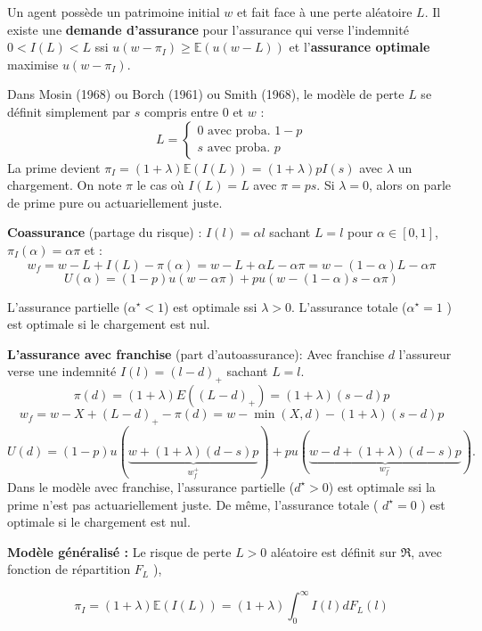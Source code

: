 \begin{f}
	
Un agent possède un patrimoine initial \(w\) et fait face à une perte aléatoire \(L\). Il existe une \textbf{demande d'assurance} pour l'assurance qui verse l'indemnité \(0<I(L)<L\) ssi \(u(w-\pi_I) \geq \mathbb{E}(u(w-L))\) et l'\textbf{assurance optimale} maximise \(u(w-\pi_I)\).

Dans Mosin (1968) ou  Borch (1961) ou Smith (1968), le modèle de perte \(L\) se définit simplement par  \(s\) compris entre 0 et  \(w\) :
	\[
	L=\left\{\begin{array}{l}
		0 \text { avec proba. } 1-p \\
		s \text { avec proba. } p
	\end{array}\right.
	\]
La prime devient \(\pi_I=(1+\lambda) \mathbb{E}(I(L))=(1+\lambda) p I(s)\) avec \(\lambda\) un chargement. On note \(\pi\) le cas où \(I(L)=L\) avec  \(\pi= p s\). Si \(\lambda=0\), alors on parle de prime pure ou actuariellement juste. 
\medskip

\textbf{Coassurance} (partage du risque) :
 \(I(l)=\alpha l\) sachant \(L=l\) pour \(\alpha \in[0,1]\), \(\pi_I(\alpha)=\alpha \pi\) et :
\[
w_{f}=w-L+I(L)-\pi(\alpha)=w-L+\alpha L-\alpha \pi=w-(1-\alpha) L-\alpha \pi
\]
\[
U(\alpha)%
=(1-p) u(w-\alpha \pi)+p u(w-(1-\alpha) s-\alpha \pi)
\]

L'assurance partielle (\(\alpha^{\star}<1\)) est optimale ssi \(\lambda>0\). L'assurance totale (\(\alpha^{\star}=1\) ) est optimale si le chargement est nul.
\medskip

\textbf{L'assurance avec franchise} (part d'autoassurance):
Avec franchise \(d\) l'assureur verse une indemnité \(I(l)=(l-d)_{+}\) sachant \(L=l\). 
\[
\pi(d)=(1+\lambda) E\left((L-d)_{+}\right)=(1+\lambda)(s-d) p
\]
\[
w_{f}=w-X+(L-d)_{+}-\pi(d)=w-\min (X, d)-(1+\lambda)(s-d) p
\]
\[
U(d)=(1-p) u(\underbrace{w+(1+\lambda)(d-s) p}_{w_{f}^{+}})+p u(\underbrace{w-d+(1+\lambda)(d-s) p}_{w_{f}^{-}}) .
\]
Dans le modèle avec franchise, l'assurance partielle (\(d^{\star}>0\)) est optimale ssi la prime n'est pas actuariellement juste. De même,  l'assurance totale ( \(d^{\star}=0\) ) est optimale si le chargement est nul.
\medskip

\textbf{Modèle généralisé :}
Le risque de perte \(L>0\) aléatoire est définit sur \(\Re\), avec fonction de répartition \(F_L\) ), 

\[
\pi_I=(1+\lambda) \mathbb{E}(I(L))=(1+\lambda) \int_{0}^{\infty} I(l) d F_{L}(l)
\]




\end{f}
